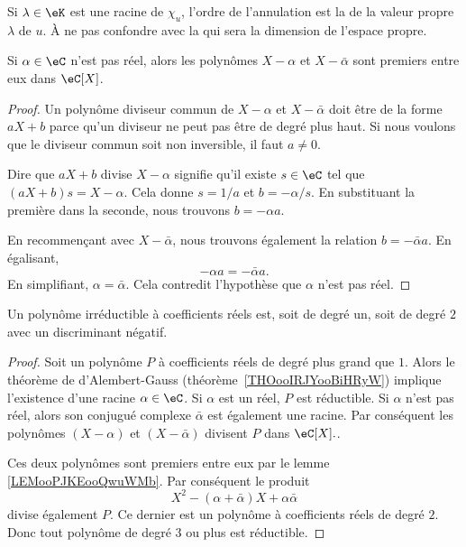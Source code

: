 \begin{definition}      \label{DEFooVFTYooJyDePn}
	Si \( \lambda\in\eK\) est une racine de \( \chi_u\), l'ordre de l'annulation est la  de la valeur propre \( \lambda\) de \( u\). À ne pas confondre avec la  qui sera la dimension de l'espace propre.
\end{definition}

\begin{lemma}       \label{LEMooPJKEooQwuWMb}
	Si \( \alpha\in \eC\) n'est pas réel, alors les polynômes \( X-\alpha\) et \( X-\bar\alpha\) sont premiers entre eux dans \( \eC[X]\).
\end{lemma}

\begin{proof}
	Un polynôme diviseur commun de \( X-\alpha\) et \( X-\bar \alpha\) doit être de la forme \( aX+b\) parce qu'un diviseur ne peut pas être de degré plus haut. Si nous voulons que le diviseur commun soit non inversible, il faut \( a\neq 0\).

	Dire que \( aX+b\) divise \( X-\alpha\) signifie qu'il existe \( s\in \eC\) tel que \( (aX+b)s=X-\alpha\). Cela donne \( s=1/a\) et \( b=-\alpha/s\). En substituant la première dans la seconde, nous trouvons \( b=-\alpha a\).

	En recommençant avec \( X-\bar\alpha\), nous trouvons également la relation \( b=-\bar \alpha a\). En égalisant,
	\begin{equation}
		-\alpha a=-\bar \alpha a.
	\end{equation}
	En simplifiant, \( \alpha=\bar \alpha\). Cela contredit l'hypothèse que \( \alpha\) n'est pas réel.
\end{proof}

\begin{proposition}     \label{PROPooUMDQooVmfDYU}
	Un polynôme irréductible à coefficients réels est, soit de degré un, soit de degré \( 2\) avec un discriminant négatif.
\end{proposition}

\begin{proof}
	Soit un polynôme \( P\) à coefficients réels de degré plus grand que \( 1\). Alors le théorème de d'Alembert-Gauss (théorème~\ref{THOooIRJYooBiHRyW}) implique l'existence d'une racine \( \alpha \in \eC \). Si \( \alpha\) est un réel, \( P\) est réductible. Si \( \alpha\) n'est pas réel, alors son conjugué complexe \( \bar \alpha\) est également une racine. Par conséquent les polynômes \( (X-\alpha)\) et \( (X-\bar \alpha)\) divisent \( P\) dans \( \eC[X]. \).

	Ces deux polynômes sont premiers entre eux par le lemme \ref{LEMooPJKEooQwuWMb}. Par conséquent le produit
	\begin{equation}
		X^2-(\alpha+\bar \alpha)X+\alpha\bar\alpha
	\end{equation}
	divise également \( P\). Ce dernier est un polynôme à coefficients réels de degré \( 2\). Donc tout polynôme de degré \( 3\) ou plus est réductible.
\end{proof}

